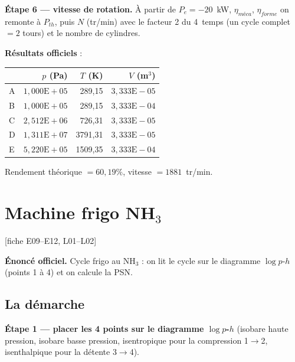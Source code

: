 \documentclass[11pt,a4paper]{article}
\newcommand{\fiche}[1]{\hfill{\small\color{cgris}[fiche #1]}}
\begin{document}
\begin{etape}
\textbf{Étape 6 --- vitesse de rotation.} À partir de $P_e=-20$~kW, $\eta_{méca}$,
$\eta_{forme}$ on remonte à $P_{th}$, puis $N$ (tr/min) avec le facteur 2 du 4~temps
(un cycle complet $=2$ tours) et le nombre de cylindres.
\end{etape}

\begin{verif}
\textbf{Résultats officiels}  :
\begin{center}
\begin{tabular}{lrrr}
\toprule
 & $p$ (Pa) & $T$ (K) & $V$ (m$^3$) \\
\midrule
A & $1{,}000\text{E}{+}05$ & 289,15 & $3{,}333\text{E}{-}05$ \\
B & $1{,}000\text{E}{+}05$ & 289,15 & $3{,}333\text{E}{-}04$ \\
C & $2{,}512\text{E}{+}06$ & 726,31 & $3{,}333\text{E}{-}05$ \\
D & $1{,}311\text{E}{+}07$ & 3791,31 & $3{,}333\text{E}{-}05$ \\
E & $5{,}220\text{E}{+}05$ & 1509,35 & $3{,}333\text{E}{-}04$ \\
\bottomrule
\end{tabular}
\end{center}
Rendement théorique $=60{,}19\%$, vitesse $=1881$~tr/min.
\end{verif}

\newpage
\section{Machine frigo NH$_3$}
\fiche{E09--E12, L01--L02}

\begin{enonce}
\textbf{Énoncé officiel.} Cycle frigo au NH$_3$ : on lit le cycle sur le diagramme
$\log p$-$h$ (points 1 à 4) et on calcule la PSN.
\end{enonce}

\subsection*{La démarche}
\begin{etape}
\textbf{Étape 1 --- placer les 4 points sur le diagramme $\log p$-$h$}
(isobare haute pression, isobare basse pression, isentropique pour la compression 1$\to$2,
isenthalpique pour la détente 3$\to$4).
\end{etape}
\end{document}
